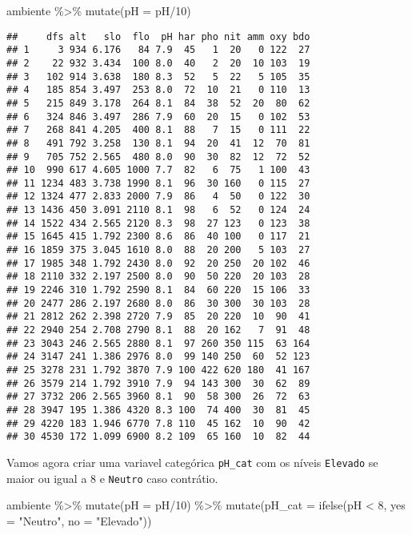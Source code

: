 \documentclass[
]{book}
\newenvironment{Shaded}{\begin{snugshade}}{\end{snugshade}}
\newcommand{\AttributeTok}[1]{\textcolor[rgb]{0.77,0.63,0.00}{#1}}
\newcommand{\DecValTok}[1]{\textcolor[rgb]{0.00,0.00,0.81}{#1}}
\newcommand{\FunctionTok}[1]{\textcolor[rgb]{0.00,0.00,0.00}{#1}}
\newcommand{\NormalTok}[1]{#1}
\newcommand{\SpecialCharTok}[1]{\textcolor[rgb]{0.00,0.00,0.00}{#1}}
\newcommand{\StringTok}[1]{\textcolor[rgb]{0.31,0.60,0.02}{#1}}
\begin{document}
\begin{Shaded}
\begin{Highlighting}[]
\NormalTok{ambiente }\SpecialCharTok{\%\textgreater{}\%} 
  \FunctionTok{mutate}\NormalTok{(}\AttributeTok{pH =}\NormalTok{ pH}\SpecialCharTok{/}\DecValTok{10}\NormalTok{)}
\end{Highlighting}
\end{Shaded}

\begin{verbatim}
##     dfs alt   slo  flo  pH har pho nit amm oxy bdo
## 1     3 934 6.176   84 7.9  45   1  20   0 122  27
## 2    22 932 3.434  100 8.0  40   2  20  10 103  19
## 3   102 914 3.638  180 8.3  52   5  22   5 105  35
## 4   185 854 3.497  253 8.0  72  10  21   0 110  13
## 5   215 849 3.178  264 8.1  84  38  52  20  80  62
## 6   324 846 3.497  286 7.9  60  20  15   0 102  53
## 7   268 841 4.205  400 8.1  88   7  15   0 111  22
## 8   491 792 3.258  130 8.1  94  20  41  12  70  81
## 9   705 752 2.565  480 8.0  90  30  82  12  72  52
## 10  990 617 4.605 1000 7.7  82   6  75   1 100  43
## 11 1234 483 3.738 1990 8.1  96  30 160   0 115  27
## 12 1324 477 2.833 2000 7.9  86   4  50   0 122  30
## 13 1436 450 3.091 2110 8.1  98   6  52   0 124  24
## 14 1522 434 2.565 2120 8.3  98  27 123   0 123  38
## 15 1645 415 1.792 2300 8.6  86  40 100   0 117  21
## 16 1859 375 3.045 1610 8.0  88  20 200   5 103  27
## 17 1985 348 1.792 2430 8.0  92  20 250  20 102  46
## 18 2110 332 2.197 2500 8.0  90  50 220  20 103  28
## 19 2246 310 1.792 2590 8.1  84  60 220  15 106  33
## 20 2477 286 2.197 2680 8.0  86  30 300  30 103  28
## 21 2812 262 2.398 2720 7.9  85  20 220  10  90  41
## 22 2940 254 2.708 2790 8.1  88  20 162   7  91  48
## 23 3043 246 2.565 2880 8.1  97 260 350 115  63 164
## 24 3147 241 1.386 2976 8.0  99 140 250  60  52 123
## 25 3278 231 1.792 3870 7.9 100 422 620 180  41 167
## 26 3579 214 1.792 3910 7.9  94 143 300  30  62  89
## 27 3732 206 2.565 3960 8.1  90  58 300  26  72  63
## 28 3947 195 1.386 4320 8.3 100  74 400  30  81  45
## 29 4220 183 1.946 6770 7.8 110  45 162  10  90  42
## 30 4530 172 1.099 6900 8.2 109  65 160  10  82  44
\end{verbatim}

Vamos agora criar uma variavel categórica \texttt{pH\_cat} com os níveis \texttt{Elevado} se maior ou igual a 8 e \texttt{Neutro} caso contrátio.

\begin{Shaded}
\begin{Highlighting}[]
\NormalTok{ambiente }\SpecialCharTok{\%\textgreater{}\%} 
  \FunctionTok{mutate}\NormalTok{(}\AttributeTok{pH =}\NormalTok{ pH}\SpecialCharTok{/}\DecValTok{10}\NormalTok{) }\SpecialCharTok{\%\textgreater{}\%} 
  \FunctionTok{mutate}\NormalTok{(}\AttributeTok{pH\_cat =} \FunctionTok{ifelse}\NormalTok{(pH }\SpecialCharTok{\textless{}} \DecValTok{8}\NormalTok{, }\AttributeTok{yes =} \StringTok{"Neutro"}\NormalTok{, }\AttributeTok{no =} \StringTok{"Elevado"}\NormalTok{))}
\end{Highlighting}
\end{Shaded}
\end{document}
